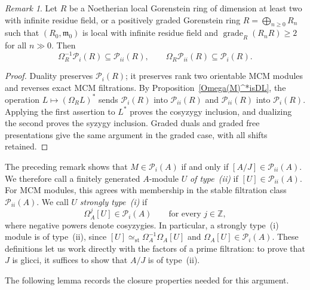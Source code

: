 \documentclass[11pt,letterpaper]{amsart}
\theoremstyle{plain}
\theoremstyle{definition}
\theoremstyle{remark}
\newtheorem{remark}[thm]{Remark}
\begin{document}
\begin{remark}\label{rem:cosyzygy-types}
Let $R$ be a Noetherian local Gorenstein ring of dimension at least two with infinite residue field, or a positively graded Gorenstein ring $R=\bigoplus_{n\geq0}R_n$ such that $(R_0,\mathfrak m_0)$ is local with infinite residue field and $\operatorname{grade}_R(R_nR)\geq2$ for all $n\gg0$.  Then
\[
\Omega_R^{-1}\mathcal P_i(R)\subseteq\mathcal P_{ii}(R),\qquad \Omega_R\mathcal P_{ii}(R)\subseteq\mathcal P_i(R).
\]
\end{remark}

\begin{proof}
Duality preserves $\mathcal P_i(R)$; it preserves rank two orientable MCM modules and reverses exact MCM filtrations. By Proposition~\ref{Omega(M)^*isDL}, the operation $L\mapsto(\Omega_RL)^*$ sends $\mathcal P_i(R)$ into $\mathcal P_{ii}(R)$ and $\mathcal P_{ii}(R)$ into $\mathcal P_i(R)$. Applying the first assertion to $L^*$ proves the cosyzygy inclusion, and dualizing the second proves the syzygy inclusion. Graded duals and graded free presentations give the same argument in the graded case, with all shifts retained.
\end{proof}

The preceding remark shows that $M\in\mathcal P_i(A)$ if and only if $[A/J]\in\mathcal P_{ii}(A)$. We therefore call a finitely generated $A$-module $U$ \emph{of type~(ii)} if $[U]\in\mathcal P_{ii}(A)$. For MCM modules, this agrees with membership in the stable filtration class $\mathcal P_{ii}(A)$. We call $U$ \emph{strongly type~(i)} if
\[
\Omega_A^j[U]\in\mathcal P_i(A)\qquad\text{for every }j\in\mathbb Z,
\]
where negative powers denote cosyzygies. In particular, a strongly type~(i) module is of type~(ii), since $[U]\simeq_{\mathrm{st}}\Omega_A^{-1}\Omega_A[U]$ and $\Omega_A[U]\in\mathcal P_i(A)$. These definitions let us work directly with the factors of a prime filtration: to prove that $J$ is glicci, it suffices to show that $A/J$ is of type~(ii).

The following lemma records the closure properties needed for this argument. 
\end{document}
